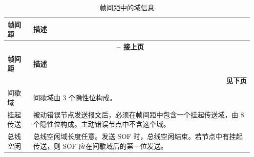 \begin{longtable}[c]{|p{2.5cm}|p{13cm}|} 
  \caption{帧间距中的域信息}
  \label{tab:twai-interframe-space} 
  \\\hline
  \rowcolor{lightgray}
  \textbf{帧间距} & \textbf{描述}
  \\\hline
  \endfirsthead
  
  \multicolumn{2}{c}{\bfseries \tablename\ \thetable{} -- 接上页}\\  \hline
  
  \rowcolor{lightgray}
    \textbf{帧间距} & \textbf{描述}
  \\\hline
  \endhead
  
  \multicolumn{2}{r}{\textbf{见下页}} \\
  \endfoot
  \endlastfoot

    间歇域 & 间歇域由 3 个隐性位构成。
           \\\hline
    挂起传送 & 被动错误节点发送报文后，必须在帧间距中包含一个挂起传送域，由 8 个隐性位构成。主动错误节点中不含这个域。
            \\\hline
    总线空闲 & 总线空闲域长度任意。发送 SOF 时，总线空闲结束。若节点中有挂起传送，则 SOF 应在间歇域后的第一位发送。         
            \\\hline
    
\end{longtable}
